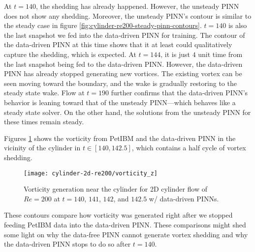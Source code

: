 At $t=140$, the shedding has already happened.
However, the unsteady PINN does not show any shedding.
Moreover, the unsteady PINN's contour is similar to the steady case in figure \ref{fig:cylinder-re200-steady-pinn-contours}.
$t=140$ is also the last snapshot we fed into the data-driven PINN for training.
The contour of the data-driven PINN at this time shows that it at least could qualitatively capture the shedding, which is expected.
At $t=144$, it is just $4$ unit time from the last snapshot being fed to the data-driven PINN.
However, the data-driven PINN has already stopped generating new vortices.
The existing vortex can be seen moving toward the boundary, and the wake is gradually restoring to the steady state wake.
Flow at $t=190$ further confirms that the data-driven PINN's behavior is leaning toward that of the unsteady PINN---which behaves like a steady state solver.
On the other hand, the solutions from the unsteady PINN for these times remain steady.

Figures \ref{fig:cylinder-re200-pinn-vort-gen} shows the vorticity from PetIBM and the data-driven PINN in the vicinity of the cylinder in $t \in [140, 142.5]$, which contains a half cycle of vortex shedding.
\begin{figure}
    \centering%
    \texttt{[image: cylinder-2d-re200/vorticity\_z]}%
    \caption{%
        Vorticity generation near the cylinder for 2D cylinder flow of $Re=\num{200}$ at $t=140$, $141$, $142$, and $142.5$ w/ data-driven PINNs.
    }
    \label{fig:cylinder-re200-pinn-vort-gen}%
\end{figure}
These contours compare how vorticity was generated right after we stopped feeding PetIBM data into the data-driven PINN.
These comparisons might shed some light on why the data-free PINN cannot generate vortex shedding and why the data-driven PINN stops to do so after $t=140$.

